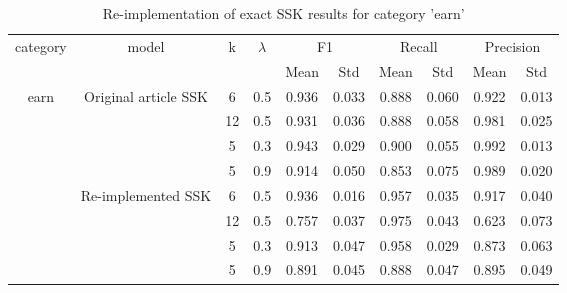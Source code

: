 \documentclass{article}
\begin{document}
\begin{table}[]
\centering
\caption{Re-implementation of exact SSK results for category 'earn'}
\label{reimpl_exact}
\begin{tabular}{|c|c|c|c|c|c|c|c|c|c|}
\hline
\multirow{2}{*}{category} & \multirow{2}{*}{model} & \multirow{2}{*}{k} &
\multirow{2}{*}{$\lambda$} & \multicolumn{2}{|c|}{F1} & \multicolumn{2}{|c|}{Recall} &
\multicolumn{2}{|c|}{Precision} \\ \cline{5-10}
 & & & & \multirow{1}{*}{Mean} & \multirow{1}{*}{Std} & \multirow{1}{*}{Mean} &
 \multirow{1}{*}{Std} & \multirow{1}{*}{Mean} & \multirow{1}{*}{Std} \\ \hline
\multirow{8}{*}{earn} &
\multirow{4}{*}{Original article SSK}
   & 6  & 0.5 & 0.936 & 0.033 & 0.888 & 0.060 & 0.922  & 0.013 \\
 & & 12 & 0.5 & 0.931 & 0.036 & 0.888 & 0.058 & 0.981 & 0.025 \\
 & & 5 & 0.3 & 0.943 & 0.029 & 0.900 & 0.055 & 0.992 & 0.013 \\
 & & 5 & 0.9 & 0.914 & 0.050 & 0.853 & 0.075 & 0.989 & 0.020 \\
\cline{2-10} &
\multirow{4}{*}{Re-implemented SSK}
  & 6  & 0.5 & 0.936 & 0.016 & 0.957 & 0.035 & 0.917 & 0.040 \\
& & 12 & 0.5 & 0.757 & 0.037 & 0.975 & 0.043 & 0.623 & 0.073 \\
& & 5 & 0.3 & 0.913 & 0.047 & 0.958 & 0.029 & 0.873 & 0.063 \\
& & 5 & 0.9 & 0.891 & 0.045 & 0.888 & 0.047 & 0.895 & 0.049 \\
\cline{2-10}
\hline
\end{tabular}
\end{table}
\end{document}
